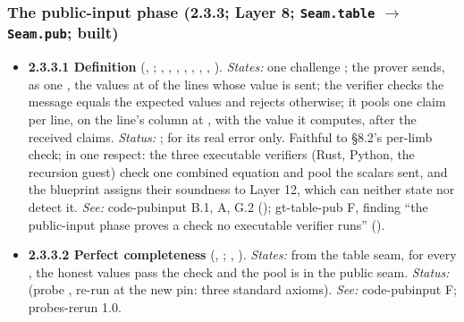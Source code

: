 \subsubsection{The public-input phase (2.3.3; Layer 8; \texttt{Seam.table} \texorpdfstring{$\to$}{to} \texttt{Seam.pub}; built)}\label{sec:obl-phase-pub}

\begin{itemize}[label={}, leftmargin=1.3em, itemindent=-1.3em, labelwidth=0pt, labelsep=0pt, itemsep=4pt, topsep=3pt]
\item {}\label{obl:node-2.3.3.1}\oblflag\textbf{2.3.3.1 Definition} (, ;  ,  ,  ,  ,  ,  ,  ,  ). \emph{States:} one challenge ; the prover sends, as one , the values at  of the lines whose value is sent; the verifier checks the message equals the expected values  and rejects otherwise; it pools one claim per line, on the line's column at , with the value it computes, after the received claims. \emph{Status:} ;  for its real error only. Faithful to §8.2's per-limb check;  in one respect: the three executable verifiers (Rust, Python, the recursion guest) check one combined equation  and pool the scalars sent, and the blueprint assigns their soundness to Layer 12, which can neither state nor detect it. \emph{See:} code-pubinput B.1, A, G.2 (); gt-table-pub F, finding ``the public-input phase proves a check no executable verifier runs'' ().
\item {}\label{obl:node-2.3.3.2}\textbf{2.3.3.2 Perfect completeness} (, ; , ). \emph{States:} from the table seam, for every , the honest values pass the check and the pool is in the public seam. \emph{Status:}  (probe , re-run at the new pin: three standard axioms). \emph{See:} code-pubinput F; probes-rerun 1.0.

\end{itemize}
